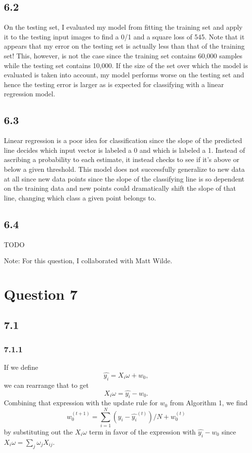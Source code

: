 \documentclass[12pt]{amsart}
\begin{document}
\subsection*{6.2}
On the testing set, I evaluated my model from fitting the training set and apply it to the testing input images to find a 0/1 and a square loss of 545.  Note that it appears that my error on the testing set is actually less than that of the training set!  This, however, is not the case since the training set contains 60,000 samples while the testing set contains 10,000.  If the size of the set over which the model is evaluated is taken into account, my model performs worse on the testing set and hence the testing error is larger as is expected for classifying with a linear regression model.

\subsection*{6.3}
Linear regression is a poor idea for classification since the slope of the predicted line decides which input vector is labeled a 0 and which is labeled a 1.  Instead of ascribing a probability to each estimate, it instead checks to see if it's above or below a given threshold.  This model does not successfully generalize to new data at all since new data points since the slope of the classifying line is so dependent on the training data and new points could dramatically shift the slope of that line, changing which class a given point belongs to.

\subsection*{6.4}
TODO

Note: For this question, I collaborated with Matt Wilde.


\section*{Question 7}

\subsection*{7.1}

\subsubsection*{7.1.1}
If we define
\begin{equation}
\hat{y_i} = X_i \omega + w_0,
\end{equation}
we can rearrange that to get 
\begin{equation}
X_i \omega = \hat{y_i} - w_0.
\end{equation}
Combining that expression with the update rule for $w_0$ from Algorithm 1, we find
\begin{equation}
w_0^{(t+1)} = \sum_{i = 1}^N (y_i - \hat{y_i}^{(t)})/N + w_0^{(t)}
\end{equation}
by substituting out the $X_i \omega$ term in favor of the expression with $\hat{y_i} - w_0$ since $X_i \omega = \sum_j \omega_j X_{ij}$.
\end{document}

